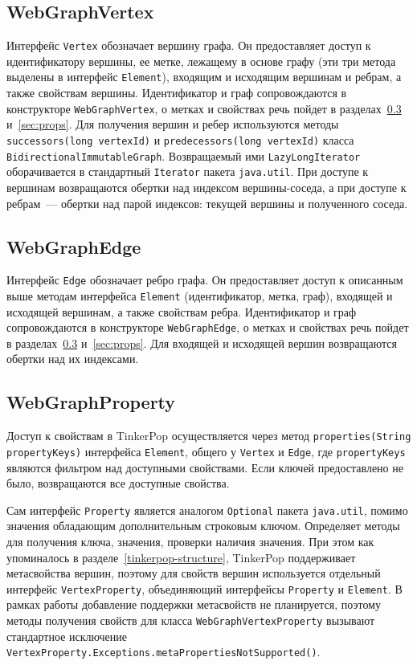 \documentclass[times,specification,annotation]{itmo-student-thesis}
\begin{document}
\subsection{WebGraphVertex}\label{subsec:webgraphvertex}

Интерфейс \texttt{Vertex} обозначает вершину графа. Он предоставляет доступ к идентификатору вершины, ее метке, лежащему в основе графу (эти три метода выделены в интерфейс \texttt{Element}), входящим и исходящим вершинам и ребрам, а также свойствам вершины.
Идентификатор и граф сопровождаются в конструкторе \texttt{WebGraphVertex}, о метках и свойствах речь пойдет в разделах~\ref{subsec:webgraphproperty} и~\ref{sec:props}.
Для получения вершин и ребер используются методы \texttt{successors(long vertexId)} и \texttt{predecessors(long vertexId)} класса \texttt{BidirectionalImmutableGraph}. Возвращаемый ими \texttt{LazyLongIterator} оборачивается в стандартный \texttt{Iterator} пакета \texttt{java.util}. При доступе к вершинам возвращаются обертки над индексом вершины-соседа, а при доступе к ребрам~--- обертки над парой индексов: текущей вершины и полученного соседа.

\subsection{WebGraphEdge}\label{subsec:webgraphedge}

Интерфейс \texttt{Edge} обозначает ребро графа. Он предоставляет доступ к описанным выше методам интерфейса \texttt{Element} (идентификатор, метка, граф), входящей и исходящей вершинам, а также свойствам ребра. Идентификатор и граф сопровождаются в конструкторе \texttt{WebGraphEdge}, о метках и свойствах речь пойдет в разделах~\ref{subsec:webgraphproperty} и~\ref{sec:props}.
Для входящей и исходящей вершин возвращаются обертки над их индексами.

\subsection{WebGraphProperty}\label{subsec:webgraphproperty}

Доступ к свойствам в TinkerPop осуществляется через метод \texttt{properties(String propertyKeys)} интерфейса \texttt{Element}, общего у \texttt{Vertex} и \texttt{Edge}, где \texttt{propertyKeys} являются фильтром над доступными свойствами. Если ключей предоставлено не было, возвращаются все доступные свойства.

Сам интерфейс \texttt{Property} является аналогом \texttt{Optional} пакета \texttt{java.util}, помимо значения обладающим дополнительным строковым ключом. Определяет методы для получения ключа, значения, проверки наличия значения. При этом как упоминалось в разделе~\ref{tinkerpop-structure}, TinkerPop поддерживает метасвойства вершин, поэтому для свойств вершин используется отдельный интерфейс \texttt{VertexProperty}, объединяющий интерфейсы \texttt{Property} и \texttt{Element}. В рамках работы добавление поддержки метасвойств не планируется, поэтому методы получения свойств для класса \texttt{WebGraphVertexProperty} вызывают стандартное исключение \texttt{VertexProperty.Exceptions.metaPropertiesNotSupported()}.
\end{document}
